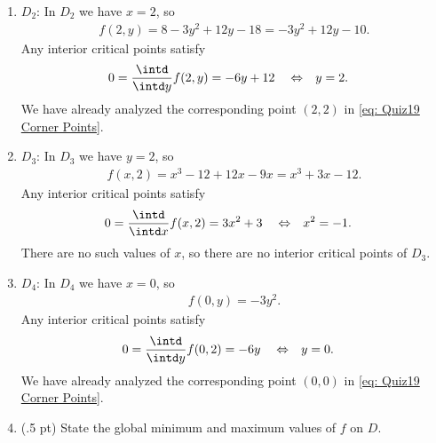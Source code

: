 {\begin{enumerate}
\item $D_{2}$: In $D_{2}$ we have $x = 2$, so
\begin{align*}
f(2,y)
=
8 - 3 y^{2} + 12 y - 18
=
-3 y^{2} + 12 y - 10.
\end{align*}
Any interior critical points satisfy
\begin{align*}
0
&=
\frac{\intd}{\intd y} f(2,y)
=
-6 y + 12
&
&\Leftrightarrow
&
y
&=
2.
\end{align*}
We have already analyzed the corresponding point $(2,2)$ in \eqref{eq: Quiz19 Corner Points}.

\item $D_{3}$: In $D_{3}$ we have $y = 2$, so
\begin{align*}
f(x,2)
=
x^{3} - 12 + 12 x - 9 x
=
x^{3} + 3 x - 12.
\end{align*}
Any interior critical points satisfy
\begin{align*}
0
&=
\frac{\intd}{\intd x} f(x,2)
=
3 x^{2} + 3
&
&\Leftrightarrow
&
x^{2}
&=
-1.
\end{align*}
There are no such values of $x$, so there are no interior critical points of $D_{3}$.

\item $D_{4}$: In $D_{4}$ we have $x = 0$, so
\begin{align*}
f(0,y)
=
-3 y^{2}.
\end{align*}
Any interior critical points satisfy
\begin{align*}
0
&=
\frac{\intd}{\intd y} f(0,2)
=
-6 y
&
&\Leftrightarrow
&
y
&=
0.
\end{align*}
We have already analyzed the corresponding point $(0,0)$ in \eqref{eq: Quiz19 Corner Points}.
\end{enumerate}
}%



\begin{enumerate}[label=(\alph*)]
\setcounter{enumi}{3}
\item (.5 pt) State the global minimum and maximum values of $f$ on $D$.%
\end{enumerate}

